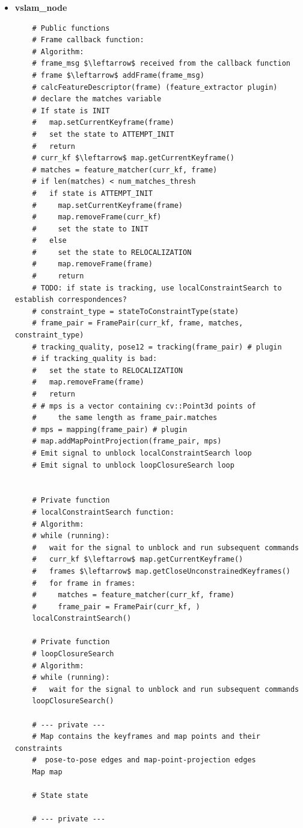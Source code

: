 \begin{itemize}
  \item{\textbf{vslam\_node}} 
  \begin{lstlisting}
    # Public functions
    # Frame callback function:
    # Algorithm:
    # frame_msg $\leftarrow$ received from the callback function
    # frame $\leftarrow$ addFrame(frame_msg)
    # calcFeatureDescriptor(frame) (feature_extractor plugin)
    # declare the matches variable
    # If state is INIT
    #   map.setCurrentKeyframe(frame)
    #   set the state to ATTEMPT_INIT
    #   return
    # curr_kf $\leftarrow$ map.getCurrentKeyframe()
    # matches = feature_matcher(curr_kf, frame)
    # if len(matches) < num_matches_thresh
    #   if state is ATTEMPT_INIT
    #     map.setCurrentKeyframe(frame)
    #     map.removeFrame(curr_kf)
    #     set the state to INIT
    #   else
    #     set the state to RELOCALIZATION
    #     map.removeFrame(frame)
    #     return
    # TODO: if state is tracking, use localConstraintSearch to establish correspondences?
    # constraint_type = stateToConstraintType(state)
    # frame_pair = FramePair(curr_kf, frame, matches, constraint_type)
    # tracking_quality, pose12 = tracking(frame_pair) # plugin
    # if tracking_quality is bad:
    #   set the state to RELOCALIZATION
    #   map.removeFrame(frame)
    #   return
    # # mps is a vector containing cv::Point3d points of 
    #     the same length as frame_pair.matches
    # mps = mapping(frame_pair) # plugin
    # map.addMapPointProjection(frame_pair, mps)
    # Emit signal to unblock localConstraintSearch loop
    # Emit signal to unblock loopClosureSearch loop


    # Private function
    # localConstraintSearch function:
    # Algorithm:
    # while (running):
    #   wait for the signal to unblock and run subsequent commands
    #   curr_kf $\leftarrow$ map.getCurrentKeyframe()
    #   frames $\leftarrow$ map.getCloseUnconstrainedKeyframes()
    #   for frame in frames:
    #     matches = feature_matcher(curr_kf, frame)
    #     frame_pair = FramePair(curr_kf, )
    localConstraintSearch()

    # Private function
    # loopClosureSearch
    # Algorithm:
    # while (running):
    #   wait for the signal to unblock and run subsequent commands
    loopClosureSearch()

    # --- private ---
    # Map contains the keyframes and map points and their constraints 
    #  pose-to-pose edges and map-point-projection edges
    Map map

    # State state

    # --- private ---
  \end{lstlisting}
  
\end{itemize}

